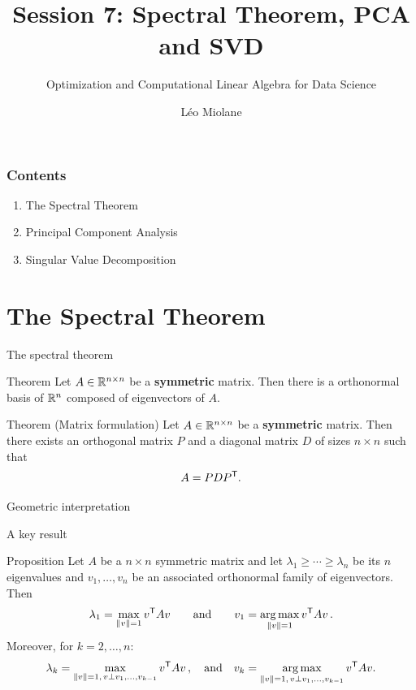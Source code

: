 \documentclass{beamer}
\title{Session 7: Spectral Theorem, PCA and SVD}
\subtitle{Optimization and Computational Linear Algebra for Data Science}
\author{Léo Miolane}
\date{}
\begin{document}
\setcounter{showProgressBar}{0}
\setcounter{showSlideNumbers}{0}

\frame{\titlepage}

\begin{frame}
	\frametitle{Contents}
	\begin{enumerate}
		\item The Spectral Theorem
		\item Principal Component Analysis
		\item Singular Value Decomposition
	\end{enumerate}
\end{frame}


\setcounter{framenumber}{0}
\setcounter{showSlideNumbers}{1}

\section{The Spectral Theorem}

\begin{frame}[t]{The spectral theorem}
	\grid

	\vspace{-0.3cm}
	\begin{block}{Theorem}
		Let $A \in \mathbb{R}^{n \times n}$ be a \textbf{symmetric} matrix. Then there is a orthonormal basis of $\mathbb{R}^n$ composed of eigenvectors of $A$.
	\end{block}

	\vspace{1.3cm}
	\begin{block}{Theorem (Matrix formulation)}
		Let $A \in \mathbb{R}^{n \times n}$ be a \textbf{symmetric} matrix. Then there exists an orthogonal matrix $P$ and a diagonal matrix $D$ of sizes $n \times n$ such that
		$$
		A = P D P^{{\sf T}}.
		$$
	\end{block}
\end{frame}

\begin{frame}[t]{Geometric interpretation}
	\grid

\end{frame}

\begin{frame}[t]{A key result}
	\grid

	\vspace{-0.4cm}
	\begin{block}{Proposition}
		Let $A$ be a $n \times n$ symmetric matrix and let $\lambda_1 \geq \cdots \geq \lambda_n$ be its $n$ eigenvalues and $v_1, \dots, v_n$ be an associated orthonormal family of eigenvectors. Then 
		$$
		\lambda_1 = \max_{\|v\| = 1} v^{{\sf T}} A v
		\qquad \text{and} \qquad
		v_1 = \operatorname*{arg\,max}_{\|v\| = 1} v^{{\sf T}} A v\,.
		$$
		Moreover, for $k=2,\dots,n$:
		$$
		\lambda_{k} = \max_{\|v\| = 1, \, v \perp v_1, \dots, v_{k-1}} v^{{\sf T}} A v\,,
		\quad \text{and} \quad
		v_{k} = \operatorname*{arg\,max}_{\|v\| = 1, \, v \perp v_1, \dots, v_{k-1}} v^{{\sf T}} A v.
		$$
	\end{block}
\end{frame}
\end{document}

